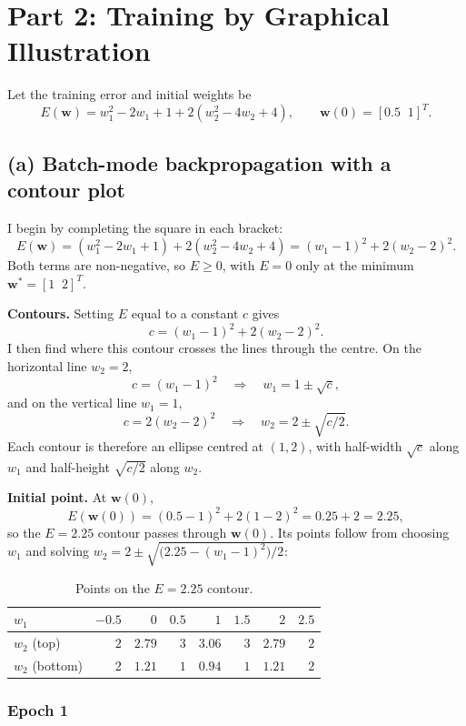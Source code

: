 \documentclass[11pt,letterpaper]{article}
\begin{document}
\clearpage
\section*{Part 2: Training by Graphical Illustration}

Let the training error and initial weights be
\[
E(\mathbf w)=w_1^2-2w_1+1+2\left(w_2^2-4w_2+4\right),\qquad
\mathbf w(0)=[0.5\;\;1]^{T}.
\]

\subsection*{(a) Batch-mode backpropagation with a contour plot}

I begin by completing the square in each bracket:
\[
E(\mathbf w)=\left(w_1^2-2w_1+1\right)+2\left(w_2^2-4w_2+4\right)
=(w_1-1)^2+2(w_2-2)^2 .
\]
Both terms are non-negative, so $E\ge0$, with $E=0$ only at the minimum
$\mathbf w^*=[1\;\;2]^{T}$.

\textbf{Contours.} Setting $E$ equal to a constant $c$ gives
\[
c=(w_1-1)^2+2(w_2-2)^2 .
\]
I then find where this contour crosses the lines through the centre. On the
horizontal line $w_2=2$,
\[
c=(w_1-1)^2\quad\Longrightarrow\quad w_1=1\pm\sqrt c ,
\]
and on the vertical line $w_1=1$,
\[
c=2(w_2-2)^2\quad\Longrightarrow\quad w_2=2\pm\sqrt{c/2}.
\]
Each contour is therefore an ellipse centred at $(1,2)$, with half-width
$\sqrt c$ along $w_1$ and half-height $\sqrt{c/2}$ along $w_2$.

\textbf{Initial point.} At $\mathbf w(0)$,
\[
E(\mathbf w(0))=(0.5-1)^2+2(1-2)^2=0.25+2=2.25 ,
\]
so the $E=2.25$ contour passes through $\mathbf w(0)$. Its points follow
from choosing $w_1$ and solving
$w_2=2\pm\sqrt{\bigl(2.25-(w_1-1)^2\bigr)/2}$:

\begin{table}[H]
\centering
\caption{Points on the $E=2.25$ contour.}
\renewcommand{\arraystretch}{1.25}
\begin{tabular}{lrrrrrrr}
\toprule
$w_1$ & $-0.5$ & $0$ & $0.5$ & $1$ & $1.5$ & $2$ & $2.5$\\
\midrule
$w_2$ (top)    & $2$ & $2.79$ & $3$ & $3.06$ & $3$ & $2.79$ & $2$\\
$w_2$ (bottom) & $2$ & $1.21$ & $1$ & $0.94$ & $1$ & $1.21$ & $2$\\
\bottomrule
\end{tabular}
\end{table}

\subsubsection*{Epoch 1}
\end{document}
